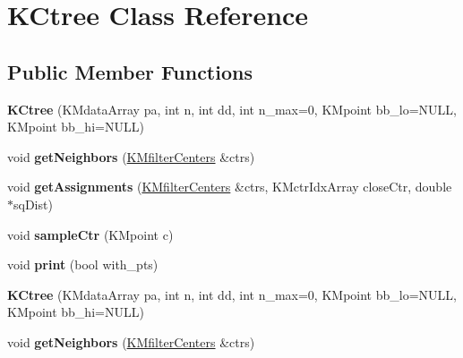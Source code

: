 \hypertarget{class_k_ctree}{
\section{KCtree Class Reference}
\label{class_k_ctree}
}
\subsection*{Public Member Functions}
\begin{DoxyCompactItemize}
\item 
\hypertarget{class_k_ctree_a71b245f4278157fb719334b3b59ca397}{
{\bfseries KCtree} (KMdataArray pa, int n, int dd, int n\_\-max=0, KMpoint bb\_\-lo=NULL, KMpoint bb\_\-hi=NULL)}
\label{class_k_ctree_a71b245f4278157fb719334b3b59ca397}

\item 
\hypertarget{class_k_ctree_a6cfedb7b0f294576bc79a08adf1c9246}{
void {\bfseries getNeighbors} (\hyperlink{class_k_mfilter_centers}{KMfilterCenters} \&ctrs)}
\label{class_k_ctree_a6cfedb7b0f294576bc79a08adf1c9246}

\item 
\hypertarget{class_k_ctree_ae71ac7d69549a8131866a5869feeafb1}{
void {\bfseries getAssignments} (\hyperlink{class_k_mfilter_centers}{KMfilterCenters} \&ctrs, KMctrIdxArray closeCtr, double $\ast$sqDist)}
\label{class_k_ctree_ae71ac7d69549a8131866a5869feeafb1}

\item 
\hypertarget{class_k_ctree_ad88615edcc8242c0f436c9d6faa53fe4}{
void {\bfseries sampleCtr} (KMpoint c)}
\label{class_k_ctree_ad88615edcc8242c0f436c9d6faa53fe4}

\item 
\hypertarget{class_k_ctree_aa59495ea7f60cc092d2a0d246396f826}{
void {\bfseries print} (bool with\_\-pts)}
\label{class_k_ctree_aa59495ea7f60cc092d2a0d246396f826}

\item 
\hypertarget{class_k_ctree_a71b245f4278157fb719334b3b59ca397}{
{\bfseries KCtree} (KMdataArray pa, int n, int dd, int n\_\-max=0, KMpoint bb\_\-lo=NULL, KMpoint bb\_\-hi=NULL)}
\label{class_k_ctree_a71b245f4278157fb719334b3b59ca397}

\item 
\hypertarget{class_k_ctree_a6cfedb7b0f294576bc79a08adf1c9246}{
void {\bfseries getNeighbors} (\hyperlink{class_k_mfilter_centers}{KMfilterCenters} \&ctrs)}
\label{class_k_ctree_a6cfedb7b0f294576bc79a08adf1c9246}


\end{DoxyCompactItemize}
